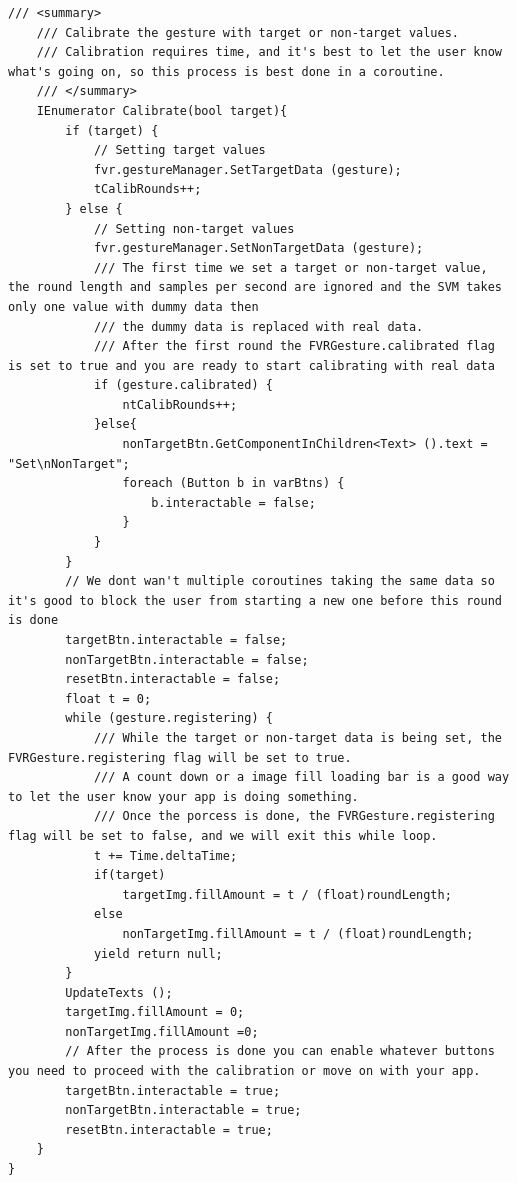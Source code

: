 \documentclass{ltjsreport}
\begin{document}
\begin{lstlisting}[caption = CalibrationManager, label = code:Calibration]
    /// <summary>
    /// Calibrate the gesture with target or non-target values.
    /// Calibration requires time, and it's best to let the user know what's going on, so this process is best done in a coroutine.
    /// </summary>
    IEnumerator Calibrate(bool target){
        if (target) {
            // Setting target values
            fvr.gestureManager.SetTargetData (gesture);
            tCalibRounds++;
        } else {
            // Setting non-target values
            fvr.gestureManager.SetNonTargetData (gesture);
            /// The first time we set a target or non-target value, the round length and samples per second are ignored and the SVM takes only one value with dummy data then
            /// the dummy data is replaced with real data. 
            /// After the first round the FVRGesture.calibrated flag is set to true and you are ready to start calibrating with real data
            if (gesture.calibrated) {
                ntCalibRounds++;
            }else{
                nonTargetBtn.GetComponentInChildren<Text> ().text = "Set\nNonTarget";
                foreach (Button b in varBtns) {
                    b.interactable = false;
                }
            }
        }
        // We dont wan't multiple coroutines taking the same data so it's good to block the user from starting a new one before this round is done
        targetBtn.interactable = false;
        nonTargetBtn.interactable = false;
        resetBtn.interactable = false;
        float t = 0;
        while (gesture.registering) {
            /// While the target or non-target data is being set, the FVRGesture.registering flag will be set to true.
            /// A count down or a image fill loading bar is a good way to let the user know your app is doing something.
            /// Once the porcess is done, the FVRGesture.registering flag will be set to false, and we will exit this while loop.
            t += Time.deltaTime;
            if(target)
                targetImg.fillAmount = t / (float)roundLength;
            else
                nonTargetImg.fillAmount = t / (float)roundLength;
            yield return null;
        }
        UpdateTexts ();
        targetImg.fillAmount = 0;
        nonTargetImg.fillAmount =0;
        // After the process is done you can enable whatever buttons you need to proceed with the calibration or move on with your app.
        targetBtn.interactable = true;
        nonTargetBtn.interactable = true;
        resetBtn.interactable = true;
    }
}

\end{lstlisting}
\end{document}
